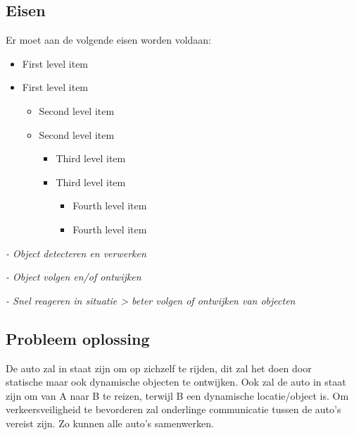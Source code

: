\subsection{Eisen}
Er moet aan de volgende eisen worden voldaan:
\begin{itemize}
   \item First level item
   \item First level item
   \begin{itemize}
     \item Second level item
     \item Second level item
     \begin{itemize}
       \item Third level item
       \item Third level item
       \begin{itemize}
         \item Fourth level item
         \item Fourth level item
       \end{itemize}
     \end{itemize}
   \end{itemize}
 \end{itemize}

\textit{- Object detecteren en verwerken}

\textit{- Object volgen en/of ontwijken}

\textit{- Snel reageren in situatie > beter volgen of ontwijken van objecten}

\subsection{Probleem oplossing}
De auto zal in staat zijn om op zichzelf te rijden, dit zal het doen door\\ statische maar ook dynamische objecten te ontwijken. 
Ook zal de auto in staat zijn om van A naar B te reizen, terwijl B een dynamische locatie/object is.
Om verkeersveiligheid te bevorderen zal onderlinge communicatie tussen de auto's vereist zijn. Zo kunnen alle auto's samenwerken.
